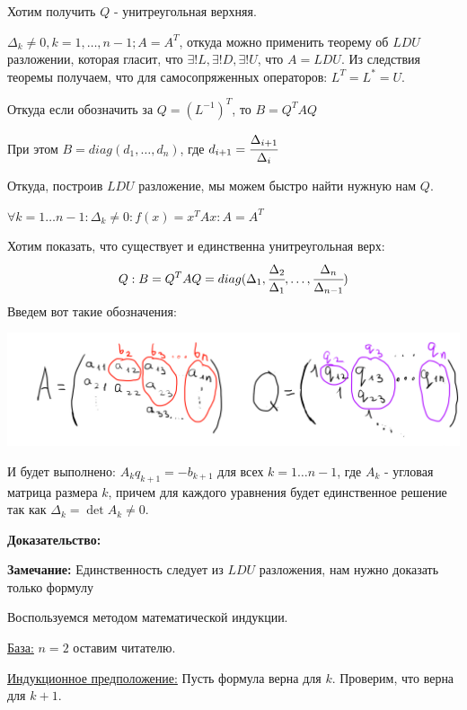
Хотим получить $Q$ - унитреугольная верхняя. 

$\Delta_k \neq 0 , k = 1,\ldots, n-1; A= A^T$, откуда можно применить теорему об $LDU$ разложении, которая гласит, что $\exists! L, \exists! D, \exists! U$, что $A = LDU$. Из следствия теоремы получаем, что для самосопряженных операторов: $L^T=L^* = U$.

Откуда если обозначить за $Q = (L^{-1})^T$, то $B = Q^T AQ$

При этом  $B = diag(d_1,\ldots,d_n)$, где $d_{i+1} = \cfrac{\Delta_{i+1}}{\Delta_i}$

Откуда, построив $LDU$ разложение, мы можем быстро найти нужную нам $Q$.



$\forall k = 1 \ldots n-1: \Delta_k\neq 0 : f(x) = x^TAx: A = A^T$

Хотим показать, что существует и единственна унитреугольная верх:
$$Q: B = Q^T AQ = diag(\Delta_1, \cfrac{\Delta_2}{\Delta_1},\ldots , \cfrac{\Delta_n}{\Delta_{n-1}})$$
Введем вот такие обозначения:
\begin{center}
   \includegraphics[width = 17cm]{assets/11_2-forms.png}
\end{center}
И будет выполнено: $A_k q_{k+1} = -b_{k+1}$ для всех $k= 1\ldots n-1$, где $A_k$ - угловая матрица размера $k$, причем для каждого уравнения будет единственное решение так как $\Delta_k = \det A_k \neq 0$.

\textbf{Доказательство:}

\textbf{Замечание:} Единственность следует из $LDU$ разложения, нам нужно доказать только формулу

Воспользуемся методом математической индукции.

\uline{База:} $n=2$ оставим читателю.

\uline{Индукционное предположение:} Пусть формула верна для $k$. Проверим, что верна для $k+1$.

